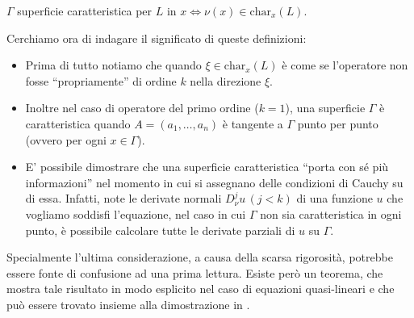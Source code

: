 \begin{definition} \label{supcarlin}
$\Gamma$ superficie caratteristica per $L$ in $x \iff \nu(x) \in\text{char}_x (L)$.
\end{definition}

Cerchiamo ora di indagare il significato di queste definizioni:
\begin{itemize}
\item Prima di tutto notiamo che quando $\xi \in \text{char}_x (L)$ è come se l'operatore non fosse ``propriamente'' di ordine $k$ nella direzione $\xi$.
\item Inoltre nel caso di operatore del primo ordine ($k=1$), una superficie $\Gamma$ è caratteristica quando $A=(a_1,\ldots ,a_n)$ è tangente a $\Gamma$ punto per punto (ovvero per ogni $x\in \Gamma$).
\item E' possibile dimostrare che una superficie caratteristica ``porta con sé più informazioni'' nel momento in cui si assegnano delle condizioni di Cauchy su di essa. Infatti, note le derivate normali $D^j_\nu u \,(j<k)$ di una funzione $u$ che vogliamo soddisfi l'equazione, nel caso in cui $\Gamma$ non sia caratteristica in ogni punto, è possibile calcolare tutte le derivate parziali di $u$ su $\Gamma$.
\end{itemize}
\newpage
Specialmente l'ultima considerazione, a causa della scarsa rigorosità, potrebbe essere fonte di confusione ad una prima lettura. Esiste però un teorema, che mostra tale risultato in modo esplicito nel caso di equazioni quasi-lineari e che può essere trovato insieme alla dimostrazione in \cite[cap.4.6]{Evans}.

